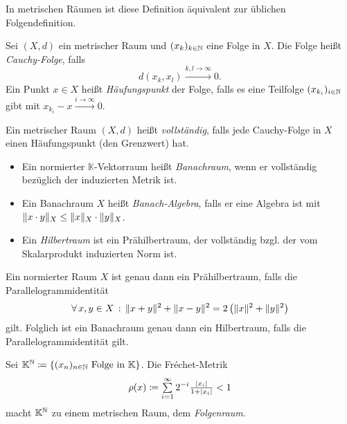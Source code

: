 \documentclass{cheat-sheet}
\newcommand{\K}{\mathbb{K}}
\newcommand{\convWith}[1]{\xrightarrow{#1 \to \infty}} %
\begin{document}
\begin{bem}
  In metrischen Räumen ist diese Definition äquivalent zur üblichen Folgendefinition.
\end{bem}

\begin{defn}
  Sei $(X, d)$ ein metrischer Raum und $(x_k)_{k \in \mathbb{N}}$ eine Folge in $X$. Die Folge heißt \emph{Cauchy-Folge}, falls
  \[ d(x_k, x_l) \convWith{k, l} 0. \]
  Ein Punkt $x \in X$ heißt \emph{Häufungspunkt} der Folge, falls es eine Teilfolge $(x_{k_i})_{i \in \mathbb{N}}$ gibt mit $x_{k_i} - x \convWith{i} 0$.
\end{defn}

\begin{defn}
  Ein metrischer Raum $(X, d)$ heißt \emph{vollständig}, falls jede Cauchy-Folge in $X$ einen Häufungspunkt (den Grenzwert) hat.
\end{defn}

\begin{defn}
  \begin{itemize}
    \item Ein normierter $\K$-Vektorraum heißt \emph{Banachraum}, wenn er vollständig bezüglich der induzierten Metrik ist.
    \item Ein Banachraum $X$ heißt \emph{Banach-Algebra}, falls er eine Algebra ist mit $\lVert x \cdot y\rVert_X \leq \lVert x\rVert_X \cdot \lVert y\rVert_X$.
    \item Ein \emph{Hilbertraum} ist ein Prähilbertraum, der vollständig bzgl. der vom Skalarprodukt induzierten Norm ist.
  \end{itemize}
\end{defn}


\begin{bem}
  Ein normierter Raum $X$ ist genau dann ein Prähilbertraum, falls die Parallelogrammidentität
  \[ \forall \, {x,y \in X} \,:\, \lVert x+y\rVert^2 + \lVert x-y\rVert^2 = 2 \left(\lVert x\rVert^2 + \lVert y\rVert^2\right) \]
  gilt. Folglich ist ein Banachraum genau dann ein Hilbertraum, falls die Parallelogrammidentität gilt.
\end{bem}


\begin{defn}
  Sei $\K^\N \coloneqq \{ (x_n)_{n \in \N} \text{ Folge in } \K \}$. Die Fréchet-Metrik
    \[ \rho(x) \coloneqq \sum_{i = 1}^\infty 2^{-i} \tfrac{ \abs{x_i} }{ 1 + \abs{x_i} } < 1 \]
  macht $\K^\N$ zu einem metrischen Raum, dem \emph{Folgenraum}.
\end{defn}
\end{document}
